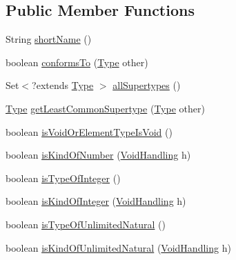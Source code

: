 \subsection*{Public Member Functions}
\begin{DoxyCompactItemize}
\item 
String \hyperlink{interfaceorg_1_1tzi_1_1use_1_1uml_1_1ocl_1_1type_1_1_type_a664739a210dafaee37f03a63305ccc72}{short\-Name} ()
\item 
boolean \hyperlink{interfaceorg_1_1tzi_1_1use_1_1uml_1_1ocl_1_1type_1_1_type_a6cde1b2fb457c46422f09d34ee7def34}{conforms\-To} (\hyperlink{interfaceorg_1_1tzi_1_1use_1_1uml_1_1ocl_1_1type_1_1_type}{Type} other)
\item 
Set$<$?extends \hyperlink{interfaceorg_1_1tzi_1_1use_1_1uml_1_1ocl_1_1type_1_1_type}{Type} $>$ \hyperlink{interfaceorg_1_1tzi_1_1use_1_1uml_1_1ocl_1_1type_1_1_type_a985286295f3d2edcec59f81fe86382cf}{all\-Supertypes} ()
\item 
\hyperlink{interfaceorg_1_1tzi_1_1use_1_1uml_1_1ocl_1_1type_1_1_type}{Type} \hyperlink{interfaceorg_1_1tzi_1_1use_1_1uml_1_1ocl_1_1type_1_1_type_a5232f630a916d153914924851401650f}{get\-Least\-Common\-Supertype} (\hyperlink{interfaceorg_1_1tzi_1_1use_1_1uml_1_1ocl_1_1type_1_1_type}{Type} other)
\item 
boolean \hyperlink{interfaceorg_1_1tzi_1_1use_1_1uml_1_1ocl_1_1type_1_1_type_a1fb8e598cad33fb6e589e1e9ffc4ee2e}{is\-Void\-Or\-Element\-Type\-Is\-Void} ()
\item 
boolean \hyperlink{interfaceorg_1_1tzi_1_1use_1_1uml_1_1ocl_1_1type_1_1_type_aa691739751d4fb3fed0711dbf6c71027}{is\-Kind\-Of\-Number} (\hyperlink{enumorg_1_1tzi_1_1use_1_1uml_1_1ocl_1_1type_1_1_type_1_1_void_handling}{Void\-Handling} h)
\item 
boolean \hyperlink{interfaceorg_1_1tzi_1_1use_1_1uml_1_1ocl_1_1type_1_1_type_aa62b2b248f1f7172770270169e8298ba}{is\-Type\-Of\-Integer} ()
\item 
boolean \hyperlink{interfaceorg_1_1tzi_1_1use_1_1uml_1_1ocl_1_1type_1_1_type_a6951923de0c793f2919b513955ea676c}{is\-Kind\-Of\-Integer} (\hyperlink{enumorg_1_1tzi_1_1use_1_1uml_1_1ocl_1_1type_1_1_type_1_1_void_handling}{Void\-Handling} h)
\item 
boolean \hyperlink{interfaceorg_1_1tzi_1_1use_1_1uml_1_1ocl_1_1type_1_1_type_a500a259474d582f1f3b7f3b87cf0d547}{is\-Type\-Of\-Unlimited\-Natural} ()
\item 
boolean \hyperlink{interfaceorg_1_1tzi_1_1use_1_1uml_1_1ocl_1_1type_1_1_type_ab4d2ab51748430d38f935f619afbaca0}{is\-Kind\-Of\-Unlimited\-Natural} (\hyperlink{enumorg_1_1tzi_1_1use_1_1uml_1_1ocl_1_1type_1_1_type_1_1_void_handling}{Void\-Handling} h)

\end{DoxyCompactItemize}
